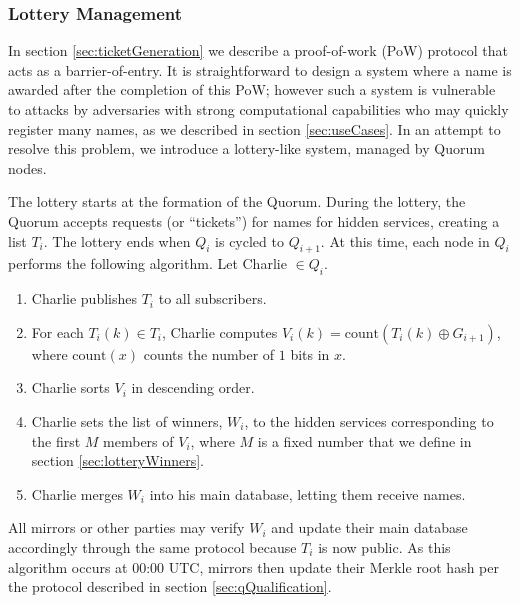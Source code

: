\documentclass[USenglish,oneside,twocolumn]{article}
\begin{document}
\subsubsection{Lottery Management} %

In section \ref{sec:ticketGeneration} we describe a proof-of-work (PoW) protocol that acts as a barrier-of-entry. It is straightforward to design a system where a name is awarded after the completion of this PoW; however such a system is vulnerable to attacks by adversaries with strong computational capabilities who may quickly register many names, as we described in section \ref{sec:useCases}. In an attempt to resolve this problem, we introduce a lottery-like system, managed by Quorum nodes.

The lottery starts at the formation of the Quorum. During the lottery, the Quorum accepts requests (or ``tickets'') for names for hidden services, creating a list $ T_{i} $. The lottery ends when $ Q_{i} $ is cycled to $ Q_{i + 1} $. At this time, each node in $ Q_{i} $ performs the following algorithm. Let Charlie $ \in Q_{i} $.

\begin{enumerate} %
	\item Charlie publishes $ T_{i} $ to all subscribers.
	\item For each $ T_{i}(k) \in T_{i} $, Charlie computes $ V_{i}(k) = \mathrm{count}(T_{i}(k) \oplus G_{i + 1})$, where $ \mathrm{count}(x) $ counts the number of $ 1 $ bits in $ x $.
	\item Charlie sorts $ V_{i} $ in descending order.
	\item Charlie sets the list of winners, $ W_{i} $, to the hidden services corresponding to the first $ M $ members of $ V_{i} $, where $ M $ is a fixed number that we define in section \ref{sec:lotteryWinners}.
	\item Charlie merges $ W_{i} $ into his main database, letting them receive names.
\end{enumerate}

All mirrors or other parties may verify $ W_{i} $ and update their main database accordingly through the same protocol because $ T_{i} $ is now public. As this algorithm occurs at 00:00 UTC, mirrors then update their Merkle root hash per the protocol described in section \ref{sec:qQualification}.
\end{document}
